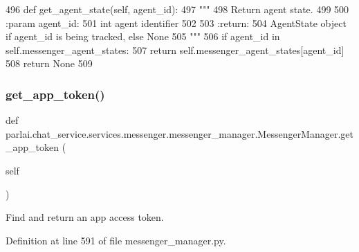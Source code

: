 \begin{DoxyCode}
496     \textcolor{keyword}{def }get\_agent\_state(self, agent\_id):
497         \textcolor{stringliteral}{"""}
498 \textcolor{stringliteral}{        Return agent state.}
499 \textcolor{stringliteral}{}
500 \textcolor{stringliteral}{        :param agent\_id:}
501 \textcolor{stringliteral}{            int agent identifier}
502 \textcolor{stringliteral}{}
503 \textcolor{stringliteral}{        :return:}
504 \textcolor{stringliteral}{            AgentState object if agent\_id is being tracked, else None}
505 \textcolor{stringliteral}{        """}
506         \textcolor{keywordflow}{if} agent\_id \textcolor{keywordflow}{in} self.messenger\_agent\_states:
507             \textcolor{keywordflow}{return} self.messenger\_agent\_states[agent\_id]
508         \textcolor{keywordflow}{return} \textcolor{keywordtype}{None}
509 
\end{DoxyCode}
\mbox{\label{classparlai_1_1chat__service_1_1services_1_1messenger_1_1messenger__manager_1_1MessengerManager_a0fa4fe590efa528624a0965dbb995683}} 
\subsubsection{\texorpdfstring{get\+\_\+app\+\_\+token()}{get\_app\_token()}}
{\footnotesize\ttfamily def parlai.\+chat\+\_\+service.\+services.\+messenger.\+messenger\+\_\+manager.\+Messenger\+Manager.\+get\+\_\+app\+\_\+token (\begin{DoxyParamCaption}\item[{}]{self }\end{DoxyParamCaption})}

\begin{DoxyVerb}Find and return an app access token.
\end{DoxyVerb}
 

Definition at line 591 of file messenger\+\_\+manager.\+py.


